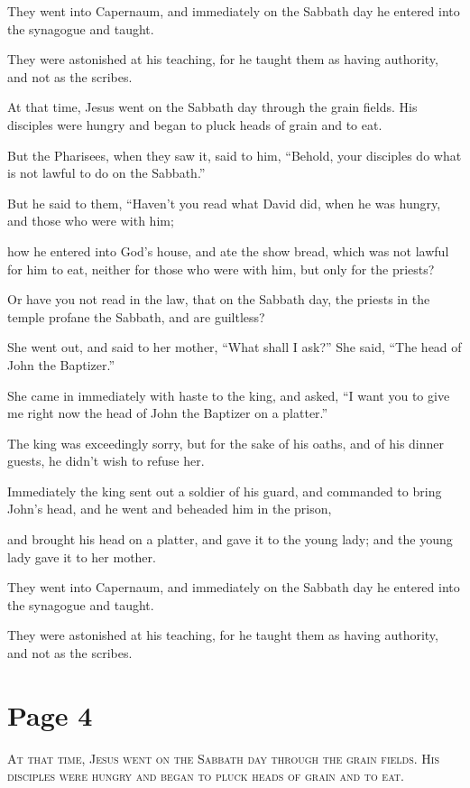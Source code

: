 They went into Capernaum, and immediately on the Sabbath day he entered into the synagogue and taught.

They were astonished at his teaching, for he taught them as having authority, and not as the scribes.

At that time, Jesus went on the Sabbath day through the grain fields. His disciples were hungry and began to pluck heads of grain and to eat.

But the Pharisees, when they saw it, said to him, “Behold, your disciples do what is not lawful to do on the Sabbath.”

But he said to them, “Haven’t you read what David did, when he was hungry, and those who were with him;

how he entered into God’s house, and ate the show bread, which was not lawful for him to eat, neither for those who were with him, but only for the priests?

Or have you not read in the law, that on the Sabbath day, the priests in the temple profane the Sabbath, and are guiltless?

She went out, and said to her mother, “What shall I ask?” She said, “The head of John the Baptizer.”

She came in immediately with haste to the king, and asked, “I want you to give me right now the head of John the Baptizer on a platter.”

The king was exceedingly sorry, but for the sake of his oaths, and of his dinner guests, he didn’t wish to refuse her.

Immediately the king sent out a soldier of his guard, and commanded to bring John’s head, and he went and beheaded him in the prison,

and brought his head on a platter, and gave it to the young lady; and the young lady gave it to her mother.

They went into Capernaum, and immediately on the Sabbath day he entered into the synagogue and taught.

They were astonished at his teaching, for he taught them as having authority, and not as the scribes.



\chapterornament
\section*{Page 4}

\lettrine{A}{t that time, Jesus went on the Sabbath day through the grain fields. His disciples were hungry and began to pluck heads of grain and to eat.}

